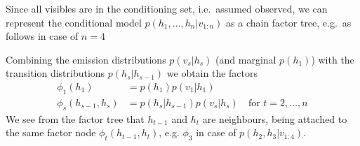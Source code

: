 \begin{exenumerate}
    \begin{solution}
      Since all visibles are in the conditioning set, i.e.\ assumed
      observed, we can represent the conditional model $p(h_1, \ldots,
      h_n|v_{1:n})$ as a chain factor tree, e.g.\ as follows in case
      of $n=4$
      \begin{center}
      \end{center}
      Combining the emission distributions $p(v_s|h_s)$ (and marginal
      $p(h_1)$) with the transition distributions $p(h_s|h_{s-1})$ we
      obtain the factors
       \begin{align}
         \phi_1(h_1) & = p(h_1) p(v_1|h_1)\\
         \phi_s(h_{s-1}, h_s) &= p(h_s|h_{s-1})p(v_s|h_s) \quad \text{for } t=2, \ldots, n
       \end{align}
       We see from the factor tree that $h_{t-1}$ and $h_t$ are
       neighbours, being attached to the same factor node
       $\phi_t(h_{t-1}, h_t)$, e.g. $\phi_3$ in case of $p(h_{2}, h_3 | v_{1:4})$.


\end{solution}
\end{exenumerate}
